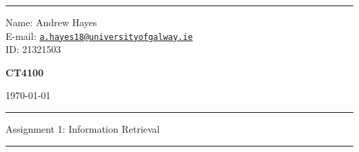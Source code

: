 \documentclass[a4paper]{article}
\begin{document}
\hrule \medskip
\begin{minipage}{0.295\textwidth} 
    \raggedright
    \footnotesize 
    Name: Andrew Hayes \\
    E-mail: \href{mailto://a.hayes18@universityofgalway.ie}{\texttt{a.hayes18@universityofgalway.ie}}  \hfill\\   
    ID: 21321503 \hfill
\end{minipage}
\begin{minipage}{0.4\textwidth} 
    \centering 
    \vspace{0.4em}
    \Large 
    \textbf{CT4100} \\ 
\end{minipage}
\begin{minipage}{0.295\textwidth} 
    \raggedleft
    \today
\end{minipage}
\medskip\hrule 
\begin{center}
    \normalsize
    Assignment 1: Information Retrieval
\end{center}
\hrule
\end{document}
